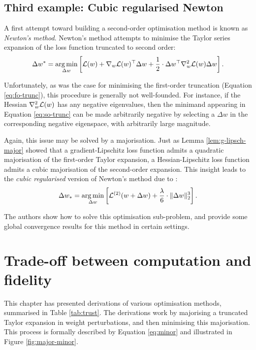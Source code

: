 \begin{refsection}
\subsection{Third example: Cubic regularised Newton}

A first attempt toward building a second-order optimisation method is known as \textit{Newton's method}. Newton's method attempts to minimise the Taylor series expansion of the loss function truncated to second order:
\begin{equation}\label{eq:so-trunc}
    \Delta w^* = \operatorname*{arg\,min}_{\Delta w} \left[\mathcal{L}(w) + \nabla_w \mathcal{L}(w)^\top \Delta w + \frac{1}{2}\cdot\Delta w^\top \nabla^2_w\mathcal{L}(w) \Delta w\right].
\end{equation}

Unfortunately, as was the case for minimising the first-order truncation (Equation \ref{eq:fo-trunc}), this procedure is generally not well-founded. For instance, if the Hessian $\nabla^2_w\mathcal{L}(w)$ has any negative eigenvalues, then the minimand appearing in Equation \ref{eq:so-trunc} can be made arbitrarily negative by selecting a $\Delta w$ in the corresponding negative eigenspace, with arbitrarily large magnitude.

Again, this issue may be solved by a majorisation. Just as Lemma \ref{lem:g-lipsch-major} showed that a gradient-Lipschitz loss function admits a quadratic majorisation of the first-order Taylor expansion, a Hessian-Lipschitz loss function admits a cubic majorisation of the second-order expansion. This insight leads to the \textit{cubic regularised} version of Newton's method due to \citet{Nesterov2006CubicRO}:
\begin{equation}
    \Delta w_* = \operatorname*{arg\,min}_{\Delta w} \left[\mathcal{L}^{(2)}(w+\Delta w) + \frac{\lambda}{6}\cdot\Vert {\Delta w} \Vert_2^3\right].
\end{equation}


The authors show how to solve this optimisation sub-problem, and provide some global convergence results for this method in certain settings.

\clearpage

\section{Trade-off between computation and fidelity}

This chapter has presented derivations of various optimisation methods, summarised in Table \ref{tab:trust}. The derivations work by majorising a truncated Taylor expansion in weight perturbations, and then minimising this majorisation. This process is formally described by Equation \ref{eq:minor} and illustrated in Figure \ref{fig:major-minor}.


\end{refsection}
